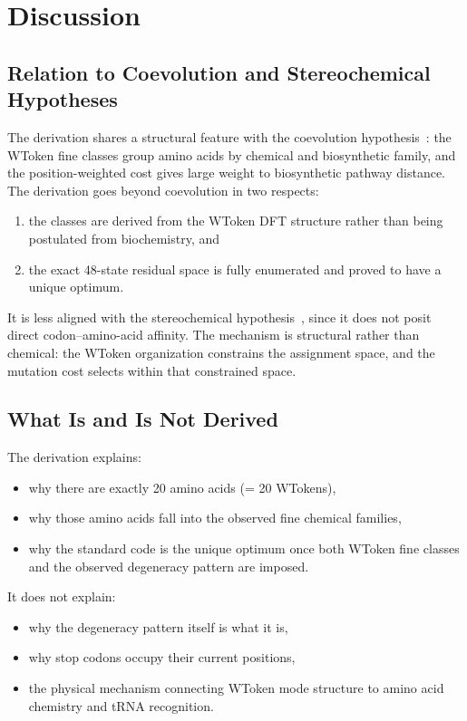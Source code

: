 \documentclass[11pt,twocolumn]{article}
\begin{document}
\section{Discussion}

\subsection{Relation to Coevolution and Stereochemical Hypotheses}

The derivation shares a structural feature with the coevolution
hypothesis~\cite{Wong1975}: the WToken fine classes group amino acids by
chemical and biosynthetic family, and the position-weighted cost gives
large weight to biosynthetic pathway distance. The derivation goes beyond
coevolution in two respects:
\begin{enumerate}
\item the classes are derived from the WToken DFT structure rather than
  being postulated from biochemistry, and
\item the exact 48-state residual space is fully enumerated and proved to
  have a unique optimum.
\end{enumerate}

It is less aligned with the stereochemical hypothesis~\cite{Woese1966},
since it does not posit direct codon--amino-acid affinity. The mechanism is
structural rather than chemical: the WToken organization constrains the
assignment space, and the mutation cost selects within that constrained
space.

\subsection{What Is and Is Not Derived}

The derivation explains:
\begin{itemize}
\item why there are exactly 20 amino acids (= 20 WTokens),
\item why those amino acids fall into the observed fine chemical families,
\item why the standard code is the unique optimum once both WToken fine
  classes and the observed degeneracy pattern are imposed.
\end{itemize}

It does not explain:
\begin{itemize}
\item why the degeneracy pattern itself is what it is,
\item why stop codons occupy their current positions,
\item the physical mechanism connecting WToken mode structure to amino acid
  chemistry and tRNA recognition.
\end{itemize}
\end{document}
